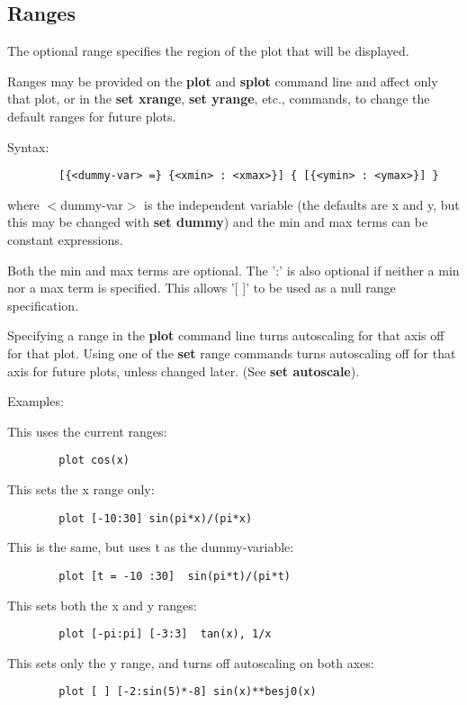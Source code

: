 \subsection{Ranges}
The optional range specifies the region of the plot that will be
displayed.

Ranges may be provided on the {\bf plot} and {\bf splot} command line and
affect only that plot, or in the {\bf set xrange}, {\bf set yrange}, etc.,
commands, to change the default ranges for future plots.

Syntax:
\begin{verbatim}
        [{<dummy-var> =} {<xmin> : <xmax>}] { [{<ymin> : <ymax>}] }
\end{verbatim}

where $<$dummy-var$>$ is the independent variable (the defaults are x and
y, but this may be changed with {\bf set dummy}) and the min and max
terms can be constant expressions.

Both the min and max terms are optional. The ':' is also optional
if neither a min nor a max term is specified. This allows '[ ]' to
be used as a null range specification.

Specifying a range in the {\bf plot} command line turns autoscaling for
that axis off for that plot. Using one of the {\bf set} range commands
turns autoscaling off for that axis for future plots, unless changed
later. (See {\bf set autoscale}).

Examples:

This uses the current ranges:
\begin{verbatim}
        plot cos(x)
\end{verbatim}

This sets the x range only:
\begin{verbatim}
        plot [-10:30] sin(pi*x)/(pi*x)
\end{verbatim}

This is the same, but uses t as the dummy-variable:
\begin{verbatim}
        plot [t = -10 :30]  sin(pi*t)/(pi*t)
\end{verbatim}

This sets both the x and y ranges:
\begin{verbatim}
        plot [-pi:pi] [-3:3]  tan(x), 1/x
\end{verbatim}

This sets only the y range, and turns off autoscaling on both axes:
\begin{verbatim}
        plot [ ] [-2:sin(5)*-8] sin(x)**besj0(x)
\end{verbatim}

